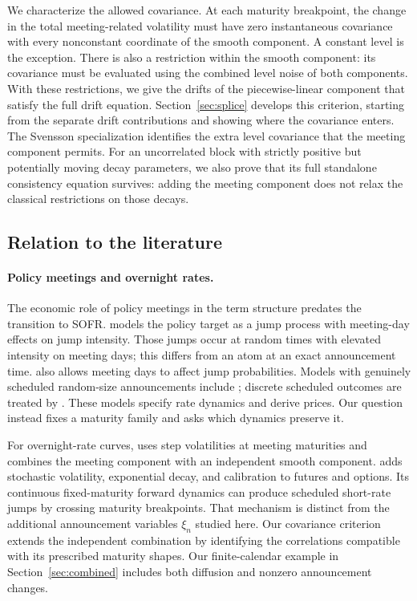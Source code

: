 We characterize the allowed covariance. At each maturity breakpoint, the change in the total meeting-related volatility must have zero instantaneous covariance with every nonconstant coordinate of the smooth component. A constant level is the exception. There is also a restriction within the smooth component: its covariance must be evaluated using the combined level noise of both components. With these restrictions, we give the drifts of the piecewise-linear component that satisfy the full drift equation. Section~\ref{sec:splice} develops this criterion, starting from the separate drift contributions and showing where the covariance enters. The Svensson specialization identifies the extra level covariance that the meeting component permits. For an uncorrelated block with strictly positive but potentially moving decay parameters, we also prove that its full standalone consistency equation survives: adding the meeting component does not relax the classical restrictions on those decays.

\subsection{Relation to the literature}
\paragraph{Policy meetings and overnight rates.}
The economic role of policy meetings in the term structure predates the transition to SOFR. \citet{piazzesi2005bond} models the policy target as a jump process with meeting-day effects on jump intensity. Those jumps occur at random times with elevated intensity on meeting days; this differs from an atom at an exact announcement time. \citet{das2002surprise} also allows meeting days to affect jump probabilities. Models with genuinely scheduled random-size announcements include \citet{kim2014jumps,backwell2021expected}; discrete scheduled outcomes are treated by \citet{silva2024discretely}. These models specify rate dynamics and derive prices. Our question instead fixes a maturity family and asks which dynamics preserve it.

For overnight-rate curves, \citet{gellert2021short} uses step volatilities at meeting maturities and combines the meeting component with an independent smooth component. \citet{brace2024sofr} adds stochastic volatility, exponential decay, and calibration to futures and options. Its continuous fixed-maturity forward dynamics can produce scheduled short-rate jumps by crossing maturity breakpoints. That mechanism is distinct from the additional announcement variables $\xi_n$ studied here. Our covariance criterion extends the independent combination by identifying the correlations compatible with its prescribed maturity shapes. Our finite-calendar example in Section~\ref{sec:combined} includes both diffusion and nonzero announcement changes.


